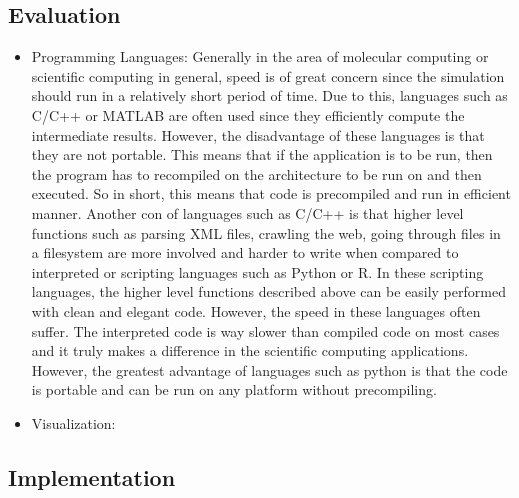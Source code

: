\subsection*{Evaluation}

\begin{itemize}
    \item Programming Languages: Generally in the area of molecular computing or scientific computing in general, speed is of great concern since the simulation should run in a relatively short period of time. Due to this, languages such as C/C++ or MATLAB are often used since they efficiently compute the intermediate results. However, the disadvantage of these languages is that they are not portable. This means that if the application is to be run, then the program has to recompiled on the architecture to be run on and then executed. So in short, this means that code is precompiled and run in efficient manner. Another con of languages such as C/C++ is that higher level functions such as parsing XML files, crawling the web, going through files in a filesystem are more involved and harder to write when compared to interpreted or scripting languages such as Python or R. In these scripting languages, the higher level functions described above can be easily performed with clean and elegant code. However, the speed in these languages often suffer. The interpreted code is way slower than compiled code on most cases and it truly makes a difference in the scientific computing applications. However, the greatest advantage of languages such as python is that the code is portable and can be run on any platform without precompiling.
    
    \item Visualization:
    
    
\end{itemize}


\subsection*{Implementation}